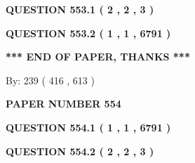 \documentclass[12pt]{article}
\begin{document}
 
 
 
   
   
  
\vspace{0.2in}
  
{\textbf{\Large{QUESTION
553.1 
 ( 2 , 2 , 3 )
}}}
  
  
  
\vspace{0.2in}
  
{\textbf{\Large{QUESTION
553.2 
 ( 1 , 1 , 6791 )
}}}
  
  
   
   
 \vspace{0.2in}
 
   
   
   
   
\vspace{1.0in} 
{\textbf{\large{ *** END OF PAPER, THANKS *** }}} 
   
   
\hspace{1.0in} By: 
 239 ( 416 ,  613 )
   
   
   
   
\newpage 
\setcounter{page}{ 
   554001 } 
   
   
   
   
 {\textbf{ \Large{ PAPER NUMBER  554  }}}
   
   
\vspace{0.2in}
   
   
   
   
   
   
 \vspace{0.2in}
 
 
 
 
   
   
  
\vspace{0.2in}
  
{\textbf{\Large{QUESTION
554.1 
 ( 1 , 1 , 6791 )
}}}
  
  
  
\vspace{0.2in}
  
{\textbf{\Large{QUESTION
554.2 
 ( 2 , 2 , 3 )
}}}
  
  
   
   
 \vspace{0.2in}
 
   
   
   
   
\end{document}

